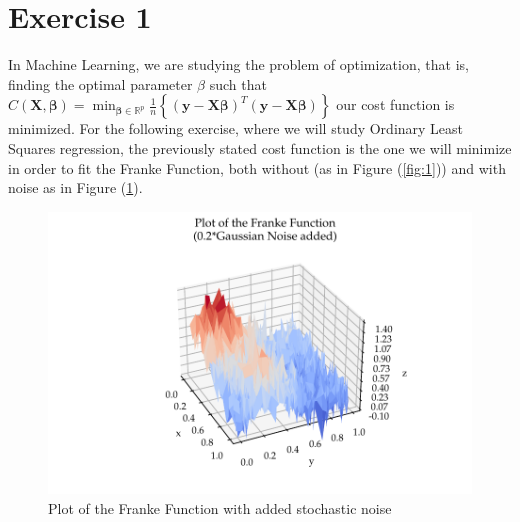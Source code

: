 \documentclass[11pt, a4paper]{article}
\begin{document}


\section*{Exercise 1}
In Machine Learning, we are studying the problem of optimization, that is, finding the optimal parameter $\beta$ such that $C(\boldsymbol{X},\boldsymbol{\beta}) =
  {\displaystyle \min_{\boldsymbol{\beta}\in {\mathbb{R}}^{p}}}\frac{1}{n}\left\{\left(\boldsymbol{y}-\boldsymbol{X}\boldsymbol{\beta}\right)^T\left(\boldsymbol{y}-\boldsymbol{X}\boldsymbol{\beta}\right)\right\}
$ our cost function is minimized. For the following exercise, where we will study Ordinary Least Squares regression, the previously stated cost function is the one we will minimize in order to fit the Franke Function, both without (as in Figure (\ref{fig:1})) and with noise as in Figure (\ref{fig:2}).

\begin{figure}[h]
  \centering
  \includegraphics[scale=0.75]{figures/EX1_franke_function_noise_preview.pdf}
  \caption{\label{fig:2}Plot of the Franke Function with added stochastic noise}
\end{figure}
\end{document}
